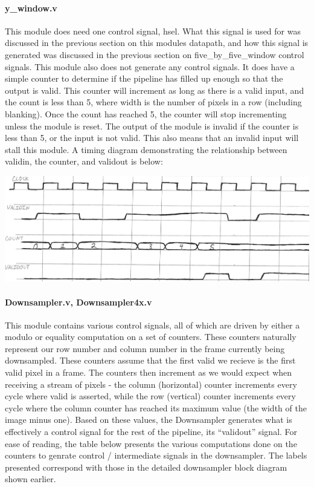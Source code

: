 \documentclass[12pt]{article}
\begin{document}
\paragraph{y\_window.v}
This module does need one control signal, hsel. What this signal is used for was 
discussed in the previous section on this modules datapath, and how this 
signal is generated was discussed in the previous section on five\_by\_five\_window 
control signals. This module also does not generate any control signals. It does 
have a simple counter to determine if the pipeline has filled up enough so that 
the output is valid. This counter will increment as long as there is a valid 
input, and the count is less than 5, where width is the number of pixels in 
a row (including blanking). Once the count has reached 5, the counter will stop 
incrementing unless the module is reset. The output of the module is invalid if 
the counter is less than 5, or the input is not valid. This also means that an 
invalid input will stall this module. A timing diagram demonstrating the 
relationship between validin, the counter, and validout is below: 

\includegraphics[width=\textwidth]{processed_image_pngs/timing_2.png}

\paragraph{Downsampler.v, Downsampler4x.v}
This module contains various control signals, all of which are driven by either
a modulo or equality computation on a set of counters. These counters naturally
represent our row number and column number in the frame currently being downsampled.
These counters assume that the first valid we recieve is the first valid pixel in a 
frame. The counters then increment as we would expect when receiving a stream of pixels - 
the column (horizontal) counter increments every cycle where valid is asserted, 
while the row (vertical) counter increments every cycle where the column counter
has reached its maximum value (the width of the image minus one). Based on these
values, the Downsampler generates what is effectively a control signal for the
rest of the pipeline, its ``validout'' signal. For ease of reading, the table
below presents the various computations done on the counters to genrate control / 
intermediate signals in the downsampler. The labels presented correspond with
those in the detailed downsampler block diagram shown earlier.
\end{document}
